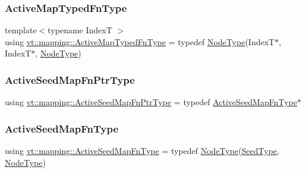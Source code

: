 \mbox{\label{namespacevt_1_1mapping_ad7c0812428b339edd904a865e0080ecd}} 
\subsubsection{\texorpdfstring{Active\+Map\+Typed\+Fn\+Type}{ActiveMapTypedFnType}}
{\footnotesize\ttfamily template$<$typename IndexT $>$ \\
using \hyperlink{namespacevt_1_1mapping_ad7c0812428b339edd904a865e0080ecd}{vt\+::mapping\+::\+Active\+Map\+Typed\+Fn\+Type} = typedef \hyperlink{namespacevt_a866da9d0efc19c0a1ce79e9e492f47e2}{Node\+Type}(IndexT$\ast$, IndexT$\ast$, \hyperlink{namespacevt_a866da9d0efc19c0a1ce79e9e492f47e2}{Node\+Type})}

\mbox{\label{namespacevt_1_1mapping_a254b50d55be91c3bd002481b2e96da7e}} 
\subsubsection{\texorpdfstring{Active\+Seed\+Map\+Fn\+Ptr\+Type}{ActiveSeedMapFnPtrType}}
{\footnotesize\ttfamily using \hyperlink{namespacevt_1_1mapping_a254b50d55be91c3bd002481b2e96da7e}{vt\+::mapping\+::\+Active\+Seed\+Map\+Fn\+Ptr\+Type} = typedef \hyperlink{namespacevt_1_1mapping_ab9cfcd87eb3ff00e63478d0197056b7e}{Active\+Seed\+Map\+Fn\+Type}$\ast$}

\mbox{\label{namespacevt_1_1mapping_ab9cfcd87eb3ff00e63478d0197056b7e}} 
\subsubsection{\texorpdfstring{Active\+Seed\+Map\+Fn\+Type}{ActiveSeedMapFnType}}
{\footnotesize\ttfamily using \hyperlink{namespacevt_1_1mapping_ab9cfcd87eb3ff00e63478d0197056b7e}{vt\+::mapping\+::\+Active\+Seed\+Map\+Fn\+Type} = typedef \hyperlink{namespacevt_a866da9d0efc19c0a1ce79e9e492f47e2}{Node\+Type}(\hyperlink{namespacevt_ae2e13198bdef4d5b8e603d6c1c7f0969}{Seed\+Type}, \hyperlink{namespacevt_a866da9d0efc19c0a1ce79e9e492f47e2}{Node\+Type})}

